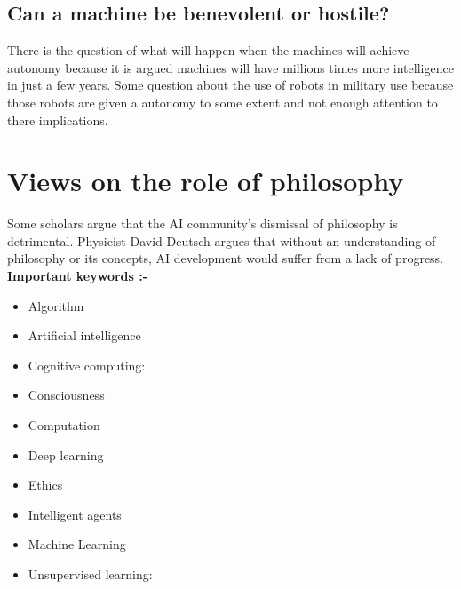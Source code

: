 \documentclass{article}
\begin{document}
\subsection{Can a machine be benevolent or hostile?}
There is the question of what will happen when the machines will achieve autonomy because it is argued machines will have millions times more intelligence in just a few years. Some question about the use of robots in military use because those robots are given a autonomy to some extent and not enough attention to there implications.

\section{Views on the role of philosophy}
Some scholars argue that the AI community's dismissal of philosophy is detrimental. Physicist David Deutsch argues that without an understanding of philosophy or its concepts, AI development would suffer from a lack of progress. \\

\textbf{Important keywords :- }

\begin{itemize}
\item Algorithm

\item Artificial intelligence
\item Cognitive computing:
\item Consciousness
\item Computation
\item Deep learning
\item Ethics
\item Intelligent agents






\item Machine Learning


\item Unsupervised learning: 
\end{itemize}
\end{document}
